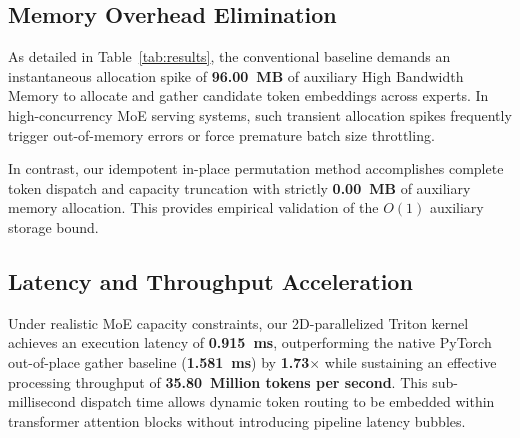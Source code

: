 \documentclass[10pt,twocolumn]{article}
\begin{document}
\begin{table}[t]
\centering
\caption{Empirical Hardware Performance Comparison of Mixture-of-Experts Token Routing on NVIDIA Ada Lovelace Architecture (\texttt{sm\_89})}
\label{tab:results}
\small
{}
\end{table}

\subsection{Memory Overhead Elimination}
As detailed in Table~\ref{tab:results}, the conventional baseline demands an instantaneous allocation spike of \textbf{96.00~MB} of auxiliary High Bandwidth Memory to allocate and gather candidate token embeddings across experts. In high-concurrency MoE serving systems, such transient allocation spikes frequently trigger out-of-memory errors or force premature batch size throttling.

In contrast, our idempotent in-place permutation method accomplishes complete token dispatch and capacity truncation with strictly \textbf{0.00~MB} of auxiliary memory allocation. This provides empirical validation of the $O(1)$ auxiliary storage bound.

\subsection{Latency and Throughput Acceleration}
Under realistic MoE capacity constraints, our 2D-parallelized Triton kernel achieves an execution latency of \textbf{0.915~ms}, outperforming the native PyTorch out-of-place gather baseline (\textbf{1.581~ms}) by \textbf{1.73$\times$} while sustaining an effective processing throughput of \textbf{35.80~Million tokens per second}. This sub-millisecond dispatch time allows dynamic token routing to be embedded within transformer attention blocks without introducing pipeline latency bubbles.
\end{document}

